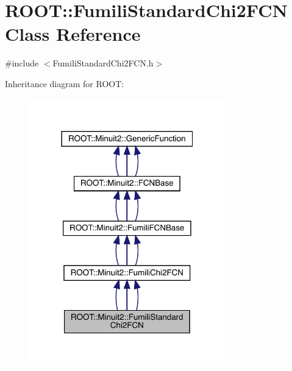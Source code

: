 \hypertarget{classROOT_1_1Minuit2_1_1FumiliStandardChi2FCN}{}\section{R\+O\+OT\+:\+:Fumili\+Standard\+Chi2\+F\+CN Class Reference}
\label{classROOT_1_1Minuit2_1_1FumiliStandardChi2FCN}


{\ttfamily \#include $<$Fumili\+Standard\+Chi2\+F\+C\+N.\+h$>$}



Inheritance diagram for R\+O\+OT\+:
\nopagebreak
\begin{figure}[H]
\begin{center}
\leavevmode
\includegraphics[width=240pt]{d4/d3d/classROOT_1_1Minuit2_1_1FumiliStandardChi2FCN__inherit__graph}
\end{center}
\end{figure}


